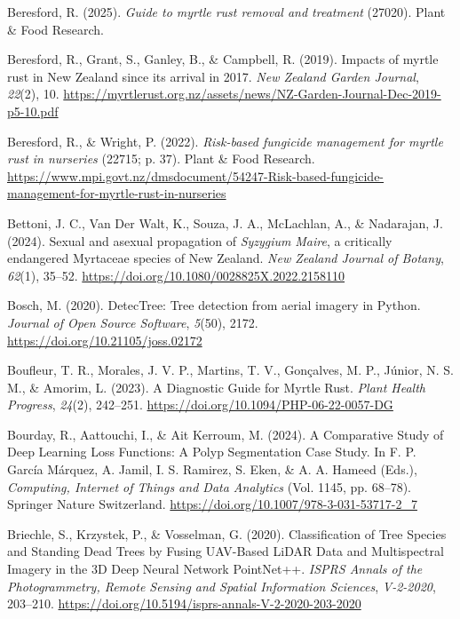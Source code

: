 \documentclass[
]{scrreprt}
\newlength{\cslhangindent}
\newenvironment{CSLReferences}[2] %
 {\begin{list}{}{%
  \setlength{\itemindent}{0pt}
  \setlength{\leftmargin}{0pt}
  \setlength{\parsep}{0pt}
  \setlength{\baselineskip}{12pt}
  \ifodd #1
   \setlength{\leftmargin}{\cslhangindent}
   \setlength{\itemindent}{-1\cslhangindent}
  \fi
  \setlength{\itemsep}{4pt}}}
 {\end{list}}
\begin{document}
\begin{CSLReferences}{1}{0}
Beresford, R. (2025). \emph{Guide to myrtle rust removal and treatment}
(27020). Plant \& Food Research.

Beresford, R., Grant, S., Ganley, B., \& Campbell, R. (2019). Impacts of
myrtle rust in {New Zealand} since its arrival in 2017. \emph{New
Zealand Garden Journal}, \emph{22}(2), 10.
\url{https://myrtlerust.org.nz/assets/news/NZ-Garden-Journal-Dec-2019-p5-10.pdf}

Beresford, R., \& Wright, P. (2022). \emph{Risk-based fungicide
management for myrtle rust in nurseries} (22715; p. 37). Plant \& Food
Research.
\url{https://www.mpi.govt.nz/dmsdocument/54247-Risk-based-fungicide-management-for-myrtle-rust-in-nurseries}

Bettoni, J. C., Van Der Walt, K., Souza, J. A., McLachlan, A., \&
Nadarajan, J. (2024). Sexual and asexual propagation of
{\emph{Syzygium}}{ \emph{Maire}}, a critically endangered {Myrtaceae}
species of {New Zealand}. \emph{New Zealand Journal of Botany},
\emph{62}(1), 35--52.
\url{https://doi.org/10.1080/0028825X.2022.2158110}

Bosch, M. (2020). {DetecTree}: {Tree} detection from aerial imagery in
{Python}. \emph{Journal of Open Source Software}, \emph{5}(50), 2172.
\url{https://doi.org/10.21105/joss.02172}

Boufleur, T. R., Morales, J. V. P., Martins, T. V., Gonçalves, M. P.,
Júnior, N. S. M., \& Amorim, L. (2023). A {Diagnostic Guide} for {Myrtle
Rust}. \emph{Plant Health Progress}, \emph{24}(2), 242--251.
\url{https://doi.org/10.1094/PHP-06-22-0057-DG}

Bourday, R., Aattouchi, I., \& Ait Kerroum, M. (2024). A {Comparative
Study} of {Deep Learning Loss Functions}: {A Polyp Segmentation Case
Study}. In F. P. García Márquez, A. Jamil, I. S. Ramirez, S. Eken, \& A.
A. Hameed (Eds.), \emph{Computing, {Internet} of {Things} and {Data
Analytics}} (Vol. 1145, pp. 68--78). Springer Nature Switzerland.
\url{https://doi.org/10.1007/978-3-031-53717-2_7}

Briechle, S., Krzystek, P., \& Vosselman, G. (2020). Classification of
{Tree Species} and {Standing Dead Trees} by {Fusing UAV-Based LiDAR
Data} and {Multispectral Imagery} in the {3D Deep Neural Network
PointNet}++. \emph{ISPRS Annals of the Photogrammetry, Remote Sensing
and Spatial Information Sciences}, \emph{V-2-2020}, 203--210.
\url{https://doi.org/10.5194/isprs-annals-V-2-2020-203-2020}


\end{CSLReferences}
\end{document}
